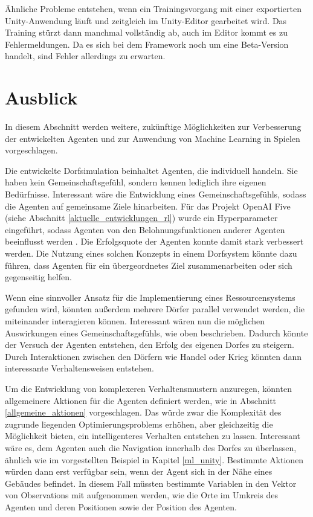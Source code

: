 Ähnliche Probleme entstehen, wenn ein Trainingsvorgang mit einer exportierten Unity-Anwendung läuft und zeitgleich im Unity-Editor gearbeitet wird. Das Training stürzt dann manchmal vollständig ab, auch im Editor kommt es zu Fehlermeldungen. Da es sich bei dem Framework noch um eine Beta-Version handelt, sind Fehler allerdings zu erwarten.

















\section{Ausblick}\label{ausblick}
In diesem Abschnitt werden weitere, zukünftige Möglichkeiten zur Verbesserung der entwickelten Agenten und zur Anwendung von Machine Learning in Spielen vorgeschlagen.

Die entwickelte Dorfsimulation beinhaltet Agenten, die individuell handeln. Sie haben kein Gemeinschaftsgefühl, sondern kennen lediglich ihre eigenen Bedürfnisse. Interessant wäre die Entwicklung eines Gemeinschaftsgefühls, sodass die Agenten auf gemeinsame Ziele hinarbeiten.
Für das Projekt OpenAI Five (siehe Abschnitt \ref{aktuelle_entwicklungen_rl}) wurde ein Hyperparameter  eingeführt, sodass Agenten von den Belohnungsfunktionen anderer Agenten beeinflusst werden \cite{openai_five}. Die Erfolgsquote der Agenten konnte damit stark verbessert werden. Die Nutzung eines solchen Konzepts in einem Dorfsystem könnte dazu führen, dass Agenten für ein übergeordnetes Ziel zusammenarbeiten oder sich gegenseitig helfen.

Wenn eine sinnvoller Ansatz für die Implementierung eines Ressourcensystems gefunden wird, könnten außerdem mehrere Dörfer parallel verwendet werden, die miteinander interagieren können. Interessant wären nun die möglichen Auswirkungen eines Gemeinschaftsgefühls, wie oben beschrieben. Dadurch könnte der Versuch der Agenten entstehen, den Erfolg des eigenen Dorfes zu steigern. Durch Interaktionen zwischen den Dörfern wie Handel oder Krieg könnten dann interessante Verhaltensweisen entstehen.

Um die Entwicklung von komplexeren Verhaltensmustern anzuregen, könnten allgemeinere Aktionen für die Agenten definiert werden, wie in Abschnitt \ref{allgemeine_aktionen} vorgeschlagen. Das würde zwar die Komplexität des zugrunde liegenden Optimierungsproblems erhöhen, aber gleichzeitig die Möglichkeit bieten, ein intelligenteres Verhalten entstehen zu lassen. Interessant wäre es, dem Agenten auch die Navigation innerhalb des Dorfes zu überlassen, ähnlich wie im vorgestellten Beispiel in Kapitel \ref{ml_unity}. Bestimmte Aktionen würden dann erst verfügbar sein, wenn der Agent sich in der Nähe eines Gebäudes befindet. In diesem Fall müssten bestimmte Variablen in den Vektor von Observations mit aufgenommen werden, wie die Orte im Umkreis des Agenten und deren Positionen sowie der Position des Agenten.

